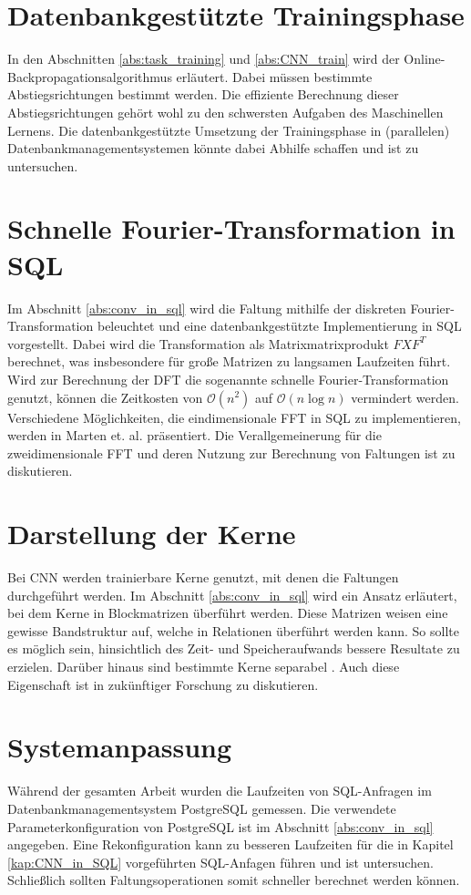 \section*{Datenbankgestützte Trainingsphase}
In den Abschnitten \ref{abs:task_training} und \ref{abs:CNN_train} wird der Online-Backpropagationsalgorithmus erläutert. Dabei müssen bestimmte Abstiegsrichtungen bestimmt werden. Die effiziente Berechnung dieser Abstiegsrichtungen gehört wohl zu den schwersten Aufgaben des Maschinellen Lernens. Die datenbankgestützte Umsetzung der Trainingsphase in (parallelen) Datenbankmanagementsystemen könnte dabei Abhilfe schaffen und ist zu untersuchen. 

\section*{Schnelle Fourier-Transformation in SQL}
Im Abschnitt \ref{abs:conv_in_sql} wird die Faltung mithilfe der diskreten Fourier-Transformation beleuchtet und eine datenbankgestützte Implementierung in SQL vorgestellt. Dabei wird die Transformation als Matrixmatrixprodukt $F X F^T$ berechnet, was insbesondere für große Matrizen zu langsamen Laufzeiten führt. Wird zur Berechnung der DFT die sogenannte schnelle Fourier-Transformation genutzt, können die Zeitkosten von $\mathcal{O}(n^2)$ auf $\mathcal{O}(n \log n)$ vermindert werden. Verschiedene Möglichkeiten, die eindimensionale FFT in SQL zu implementieren, werden in Marten et. al.\cite{DBLP:conf/adbis/Marten0019} präsentiert. Die Verallgemeinerung für die zweidimensionale FFT und deren Nutzung zur Berechnung von Faltungen ist zu diskutieren.

\section*{Darstellung der Kerne}
Bei CNN werden trainierbare Kerne genutzt, mit denen die Faltungen durchgeführt werden. Im Abschnitt \ref{abs:conv_in_sql} wird ein Ansatz erläutert, bei dem Kerne in Blockmatrizen überführt werden. Diese Matrizen weisen eine gewisse Bandstruktur auf, welche in Relationen überführt werden kann. So sollte es möglich sein, hinsichtlich des Zeit- und Speicheraufwands bessere Resultate zu erzielen. Darüber hinaus sind bestimmte Kerne separabel \cite{DBLP:journals/tcas/BaiZH18}. Auch diese Eigenschaft ist in zukünftiger Forschung zu diskutieren.

\section*{Systemanpassung}
Während der gesamten Arbeit wurden die Laufzeiten von SQL-Anfragen im Datenbankmanagementsystem PostgreSQL gemessen. Die verwendete Parameterkonfiguration von PostgreSQL ist im Abschnitt \ref{abs:conv_in_sql} angegeben. Eine Rekonfiguration kann zu besseren Laufzeiten für die in Kapitel \ref{kap:CNN_in_SQL} vorgeführten SQL-Anfagen führen und ist untersuchen. Schließlich sollten Faltungsoperationen somit schneller berechnet werden können.